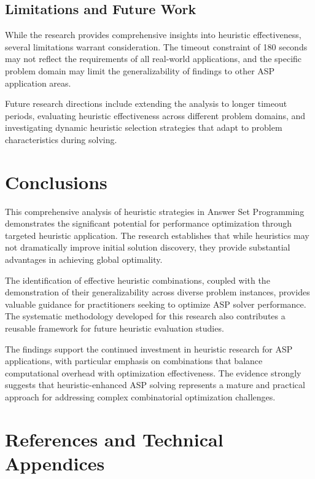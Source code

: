 \documentclass[11pt,a4paper]{article}
\begin{document}
\subsection{Limitations and Future Work}

While the research provides comprehensive insights into heuristic effectiveness, several limitations warrant consideration. The timeout constraint of 180 seconds may not reflect the requirements of all real-world applications, and the specific problem domain may limit the generalizability of findings to other ASP application areas.

Future research directions include extending the analysis to longer timeout periods, evaluating heuristic effectiveness across different problem domains, and investigating dynamic heuristic selection strategies that adapt to problem characteristics during solving.

\section{Conclusions}

This comprehensive analysis of heuristic strategies in Answer Set Programming demonstrates the significant potential for performance optimization through targeted heuristic application. The research establishes that while heuristics may not dramatically improve initial solution discovery, they provide substantial advantages in achieving global optimality.

The identification of effective heuristic combinations, coupled with the demonstration of their generalizability across diverse problem instances, provides valuable guidance for practitioners seeking to optimize ASP solver performance. The systematic methodology developed for this research also contributes a reusable framework for future heuristic evaluation studies.

The findings support the continued investment in heuristic research for ASP applications, with particular emphasis on combinations that balance computational overhead with optimization effectiveness. The evidence strongly suggests that heuristic-enhanced ASP solving represents a mature and practical approach for addressing complex combinatorial optimization challenges.

\section{References and Technical Appendices}
\end{document}
